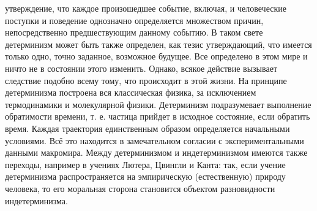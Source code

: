 \documentclass[12pt]{article}
\begin{document}
утверждение, что каждое произошедшее событие, включая, и человеческие поступки и поведение однозначно 
определяется  множеством  причин,  непосредственно  предшествующим  данному  событию.  В  таком  свете
детерминизм может быть также определен, как тезис утверждающий, что имеется только одно, точно заданное,
возможное будущее.
Все  определено  в  этом  мире  и  ничто  не  в  состоянии  этого  изменить.  Однако,  всякое  действие  вызывает
следствие  подобно  всему  тому,  что  происходит  в  этой  жизни.  На  принципе  детерминизма  построена  вся
классическая физика, за исключением термодинамики и молекулярной физики. Детерминизм подразумевает
выполнение обратимости времени, т. е. частица прийдет в исходное состояние, если обратить время. Каждая
траектория единственным образом определяется начальными условиями. Всё это находится в замечательном
согласии с экспериментальными данными макромира.
Между детерминизмом и индетерминизмом имеются также переходы, например в учениях Лютера, Цвингли и
Канта: так, если учение детерминизма распространяется на эмпирическую (естественную) природу человека, то
его моральная сторона становится объектом разновидности индетерминизма.

\newpage
\end{document}
